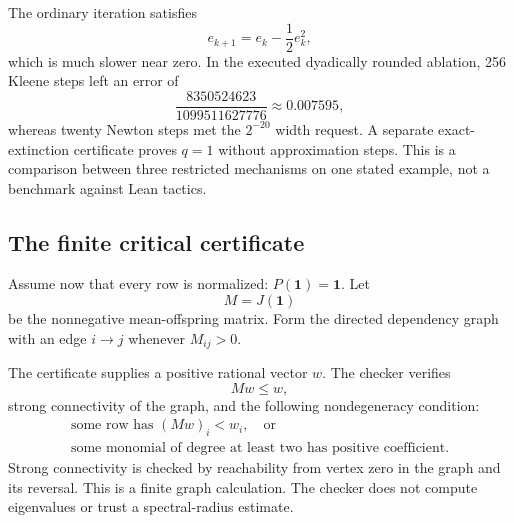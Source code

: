 \documentclass[11pt,a4paper]{article}
\theoremstyle{definition}\newtheorem{definition}[theorem]{Definition}
\theoremstyle{remark}\newtheorem{remark}[theorem]{Remark}
\newcommand{\one}{\mathbf 1}\newcommand{\zero}{\mathbf 0}
\begin{document}
The ordinary iteration satisfies
\[
 e_{k+1}=e_k-\frac12e_k^2,
\]
which is much slower near zero. In the executed dyadically rounded ablation, 256 Kleene steps left an error of
\[
 \frac{8350524623}{1099511627776}\approx0.007595,
\]
whereas twenty Newton steps met the $2^{-20}$ width request. A separate exact-extinction certificate proves $q=1$ without approximation steps. This is a comparison between three restricted mechanisms on one stated example, not a benchmark against Lean tactics.

\subsection{The finite critical certificate}
Assume now that every row is normalized: $P(\one)=\one$. Let
\[
 M=J(\one)
\]
be the nonnegative mean-offspring matrix. Form the directed dependency graph with an edge $i\to j$ whenever $M_{ij}>0$.

The certificate supplies a positive rational vector $w$. The checker verifies
\begin{equation}
 \label{eq:criticalweight}
 Mw\le w,
\end{equation}
strong connectivity of the graph, and the following nondegeneracy condition:
\begin{equation}
 \label{eq:nondegenerate}
 \begin{gathered}
 \text{some row has }(Mw)_i<w_i,\quad\text{or}\\
 \text{some monomial of degree at least two has positive coefficient}.
 \end{gathered}
\end{equation}
Strong connectivity is checked by reachability from vertex zero in the graph and its reversal. This is a finite graph calculation. The checker does not compute eigenvalues or trust a spectral-radius estimate.
\end{document}

